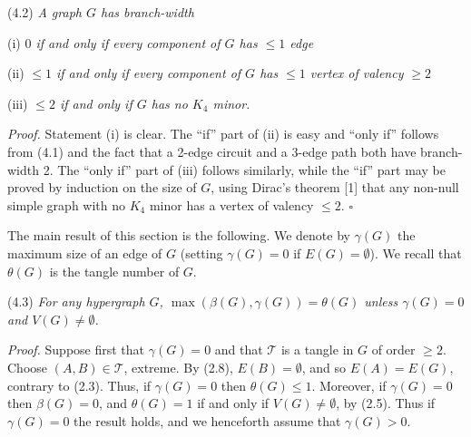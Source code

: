 \stmt
(4.2) \textit{A graph $G$ has branch-width}

\hspace*{12pt}(i) \textit{$0$ if and only if every component of $G$ has $\le 1$ edge}

\hspace*{12pt}(ii) \textit{$\le 1$ if and only if every component of $G$ has $\le 1$ vertex of valency $\ge 2$}

\hspace*{12pt}(iii) \textit{$\le 2$ if and only if $G$ has no $K_4$ minor.}

\textit{Proof.} Statement (i) is clear. The ``if'' part of (ii) is easy and ``only if'' follows from (4.1) and the fact that a 2-edge circuit and a 3-edge path both have branch-width 2. The ``only if'' part of (iii) follows similarly, while the ``if'' part may be proved by induction on the size of $G$, using Dirac's theorem [1] that any non-null simple graph with no $K_4$ minor has a vertex of valency $\le 2$. $\square$

The main result of this section is the following. We denote by $\gamma(G)$ the maximum size of an edge of $G$ (setting $\gamma(G) = 0$ if $E(G) = \emptyset$). We recall that $\theta(G)$ is the tangle number of $G$.

\stmt
(4.3) \textit{For any hypergraph $G$, $\max(\beta(G), \gamma(G)) = \theta(G)$ unless $\gamma(G) = 0$ and $V(G) \ne \emptyset$.}

\textit{Proof.} Suppose first that $\gamma(G) = 0$ and that $\mathscr{T}$ is a tangle in $G$ of order $\ge 2$. Choose $(A, B) \in \mathscr{T}$, extreme. By (2.8), $E(B) = \emptyset$, and so $E(A) = E(G)$, contrary to (2.3). Thus, if $\gamma(G) = 0$ then $\theta(G) \le 1$. Moreover, if $\gamma(G) = 0$ then $\beta(G) = 0$, and $\theta(G) = 1$ if and only if $V(G) \ne \emptyset$, by (2.5). Thus if $\gamma(G) = 0$ the result holds, and we henceforth assume that $\gamma(G) > 0$.

